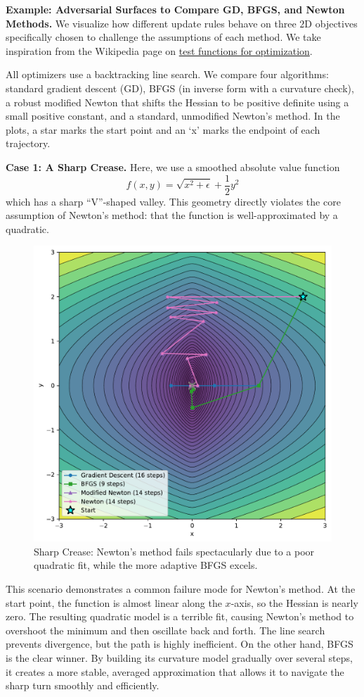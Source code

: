 \begin{exampleBox}
    \textbf{Example: Adversarial Surfaces to Compare GD, BFGS, and Newton Methods.}
    We visualize how different update rules behave on three $2$D objectives specifically chosen to challenge the assumptions of each method. We take inspiration from the Wikipedia page on \href{https://en.wikipedia.org/wiki/Test_functions_for_optimization}{test functions for optimization}.
    
    All optimizers use a backtracking line search. We compare four algorithms: standard gradient descent (GD), BFGS (in inverse form with a curvature check), a robust modified Newton that shifts the Hessian to be positive definite using a small positive constant, and a standard, unmodified Newton's method. In the plots, a star marks the start point and an `x' marks the endpoint of each trajectory.
    
    \textbf{Case 1: A Sharp Crease.}
    Here, we use a smoothed absolute value function
    \begin{equation*}
        f(x,y) = \sqrt{x^2 + \epsilon} + \frac{1}{2}y^2
    \end{equation*}
    which has a sharp ``V''-shaped valley. This geometry directly violates the core assumption of Newton's method: that the function is well-approximated by a quadratic.

    \begin{figure}[H]
        \centering
        \includegraphics[width=.5\textwidth]{figs/optimization/paths_crease.pdf}
        \caption{Sharp Crease: Newton's method fails spectacularly due to a poor quadratic fit, while the more adaptive BFGS excels.}
    \end{figure}
    
    This scenario demonstrates a common failure mode for Newton's method. At the start point, the function is almost linear along the $x$-axis, so the Hessian is nearly zero. The resulting quadratic model is a terrible fit, causing Newton's method to overshoot the minimum and then oscillate back and forth. The line search prevents divergence, but the path is highly inefficient. On the other hand, BFGS is the clear winner. By building its curvature model gradually over several steps, it creates a more stable, averaged approximation that allows it to navigate the sharp turn smoothly and efficiently.
    
\end{exampleBox}


